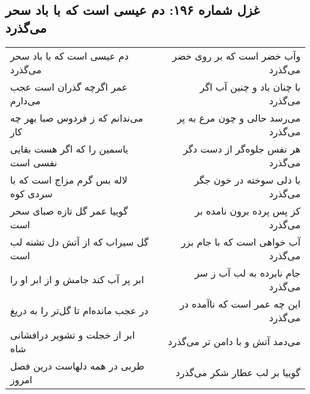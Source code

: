 \begin{center}
\section*{غزل شماره ۱۹۶: دم عیسی است که با باد سحر می‌گذرد}
\label{sec:196}
\begin{longtable}{l p{0.5cm} r}
دم عیسی است که با باد سحر می‌گذرد
&&
وآب خضر است که بر روی خضر می‌گذرد
\\
عمر اگرچه گذران است عجب می‌دارم
&&
با چنان باد و چنین آب اگر می‌گذرد
\\
می‌ندانم که ز فردوس صبا بهر چه کار
&&
می‌رسد حالی و چون مرغ به پر می‌گذرد
\\
یاسمین را که اگر هست بقایی نفسی است
&&
هر نفس جلوه‌گر از دست دگر می‌گذرد
\\
لاله بس گرم مزاج است که با سردی کوه
&&
با دلی سوخته در خون جگر می‌گذرد
\\
گوییا عمر گل تازه صبای سحر است
&&
کز پس پرده برون نامده بر می‌گذرد
\\
گل سیراب که از آتش دل تشنه لب است
&&
آب خواهی است که با جام بزر می‌گذرد
\\
ابر پر آب کند جامش و از ابر او را
&&
جام نابرده به لب آب ز سر می‌گذرد
\\
در عجب مانده‌ام تا گل‌تر را به دریغ
&&
این چه عمر است که ناآمده در می‌گذرد
\\
ابر از خجلت و تشویر درافشانی شاه
&&
می‌دمد آتش و با دامن تر می‌گذرد
\\
طربی در همه دلهاست درین فصل امروز
&&
گوییا بر لب عطار شکر می‌گذرد
\\
\end{longtable}
\end{center}
